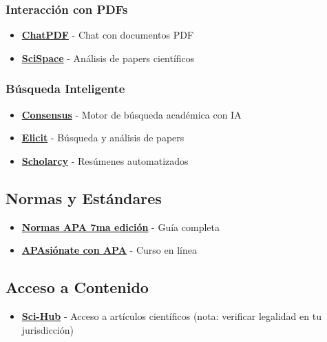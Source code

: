 \documentclass[
  jou,
  floatsintext,
  longtable,
  a4paper,
  nolmodern,
  notxfonts,
  notimes,
  12pt,
  colorlinks=true,linkcolor=blue,citecolor=blue,urlcolor=blue]{apa7}
\providecommand{\tightlist}{%
  \setlength{\itemsep}{0pt}\setlength{\parskip}{0pt}}
\begin{document}
\subsubsection{Interacción con PDFs}\label{interacciuxf3n-con-pdfs}

\begin{itemize}
\tightlist
\item
  \textbf{\href{https://www.chatpdf.com/}{ChatPDF}} - Chat con
  documentos PDF
\item
  \textbf{\href{https://typeset.io/}{SciSpace}} - Análisis de papers
  científicos
\end{itemize}

\subsubsection{Búsqueda Inteligente}\label{buxfasqueda-inteligente}

\begin{itemize}
\tightlist
\item
  \textbf{\href{https://consensus.app/}{Consensus}} - Motor de búsqueda
  académica con IA
\item
  \textbf{\href{https://elicit.com/?workflow=table-of-papers}{Elicit}} -
  Búsqueda y análisis de papers
\item
  \textbf{\href{https://www.scholarcy.com/}{Scholarcy}} - Resúmenes
  automatizados
\end{itemize}

\subsection{Normas y Estándares}\label{normas-y-estuxe1ndares}

\begin{itemize}
\tightlist
\item
  \textbf{\href{https://normas-apa.org/}{Normas APA 7ma edición}} - Guía
  completa
\item
  \textbf{\href{https://centrodeescriturajaveriano.thinkific.com/courses/normas-apa-septima-edicion}{APAsiónate
  con APA}} - Curso en línea
\end{itemize}

\subsection{Acceso a Contenido}\label{acceso-a-contenido}

\begin{itemize}
\tightlist
\item
  \textbf{\href{https://sci-hub.hkvisa.net/}{Sci-Hub}} - Acceso a
  artículos científicos (nota: verificar legalidad en tu jurisdicción)
\end{itemize}
\end{document}
